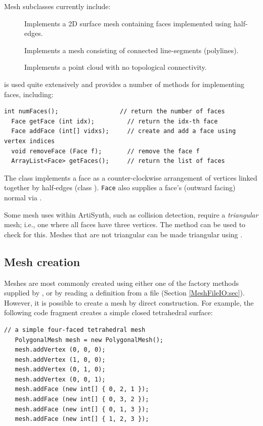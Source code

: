 Mesh subclasses currently include:

\begin{description}

\item[]\mbox{}

Implements a 2D surface
mesh containing faces implemented using half-edges.

\item[]\mbox{}

Implements a mesh
consisting of connected line-segments (polylines).

\item[]\mbox{}

Implements a point cloud with
no topological connectivity.

\end{description}

 is used quite extensively
and provides a number of methods for implementing faces, including:
%
\begin{lstlisting}[]
  int numFaces();                 // return the number of faces
  Face getFace (int idx);         // return the idx-th face
  Face addFace (int[] vidxs);     // create and add a face using vertex indices
  void removeFace (Face f);       // remove the face f
  ArrayList<Face> getFaces();     // return the list of faces
\end{lstlisting}
%
The class  implements a face as a
counter-clockwise arrangement of vertices linked together by
half-edges (class ).
{\tt Face} also supplies a face's (outward facing) normal
via 
.

Some mesh uses within ArtiSynth, such as collision detection, require a
{\it triangular} mesh; i.e., one where all faces have three vertices.
The method 
can be used to check for this. Meshes that are not triangular can be
made triangular using 
.

\subsection{Mesh creation}

Meshes are most commonly created using either one of the factory
methods supplied by , or by reading a
definition from a file (Section \ref{MeshFileIO:sec}).  However, it is
possible to create a mesh by direct construction. For example, the
following code fragment creates a simple closed tetrahedral surface:
%
\begin{lstlisting}[]
   // a simple four-faced tetrahedral mesh 
   PolygonalMesh mesh = new PolygonalMesh();
   mesh.addVertex (0, 0, 0);
   mesh.addVertex (1, 0, 0);
   mesh.addVertex (0, 1, 0);
   mesh.addVertex (0, 0, 1);
   mesh.addFace (new int[] { 0, 2, 1 });
   mesh.addFace (new int[] { 0, 3, 2 });
   mesh.addFace (new int[] { 0, 1, 3 });
   mesh.addFace (new int[] { 1, 2, 3 });      
\end{lstlisting}
%

